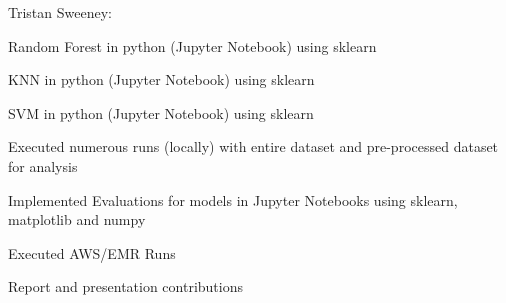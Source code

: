 \documentclass{neu_handout}
\begin{document}
Tristan Sweeney:
\begin{myitemize}
  \item Random Forest in python (Jupyter Notebook) using sklearn 
  \item KNN in python (Jupyter Notebook) using sklearn
  \item SVM in python (Jupyter Notebook) using sklearn 
  \item Executed numerous runs (locally) with entire dataset and pre-processed dataset for analysis
   \item Implemented Evaluations for models in Jupyter Notebooks using sklearn, matplotlib and numpy
  \item Executed AWS/EMR Runs
  \item Report and presentation contributions
\end{myitemize}
\end{document}
